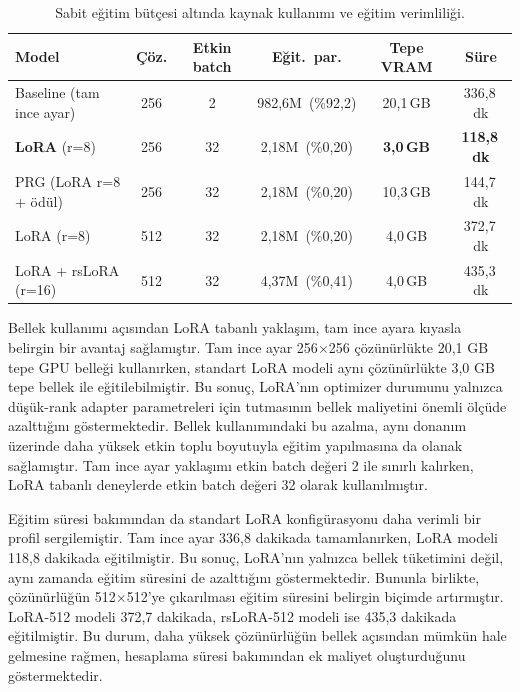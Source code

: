 \documentclass[11pt]{article}
\begin{document}
\begin{table}[htbp]
\centering
\caption{Sabit eğitim bütçesi altında kaynak kullanımı ve eğitim verimliliği.}
\label{tab:eff}
\small
\begin{tabular}{@{}lccccc@{}}
\toprule
\textbf{Model} & \textbf{Çöz.} & \textbf{Etkin batch} & \textbf{Eğit.\ par.} &
\textbf{Tepe VRAM} & \textbf{Süre} \\
\midrule
Baseline (tam ince ayar) & 256 & 2  & 982,6M\ (\%92,2) & 20,1\,GB & 336,8\,dk \\
\textbf{LoRA} (r=8)      & 256 & 32 & 2,18M\ (\%0,20)  & \textbf{3,0\,GB} & \textbf{118,8\,dk} \\
PRG (LoRA r=8 + ödül)    & 256 & 32 & 2,18M\ (\%0,20)  & 10,3\,GB & 144,7\,dk \\
LoRA (r=8)               & 512 & 32 & 2,18M\ (\%0,20)  & 4,0\,GB  & 372,7\,dk \\
LoRA + rsLoRA (r=16)     & 512 & 32 & 4,37M\ (\%0,41)  & 4,0\,GB  & 435,3\,dk \\
\bottomrule
\end{tabular}
\end{table}

Bellek kullanımı açısından LoRA tabanlı yaklaşım, tam ince ayara kıyasla belirgin
bir avantaj sağlamıştır. Tam ince ayar 256$\times$256 çözünürlükte 20,1 GB tepe
GPU belleği kullanırken, standart LoRA modeli aynı çözünürlükte 3,0 GB tepe
bellek ile eğitilebilmiştir. Bu sonuç, LoRA'nın optimizer durumunu yalnızca
düşük-rank adapter parametreleri için tutmasının bellek maliyetini önemli ölçüde
azalttığını göstermektedir. Bellek kullanımındaki bu azalma, aynı donanım
üzerinde daha yüksek etkin toplu boyutuyla eğitim yapılmasına da olanak
sağlamıştır. Tam ince ayar yaklaşımı etkin batch değeri 2 ile sınırlı kalırken,
LoRA tabanlı deneylerde etkin batch değeri 32 olarak kullanılmıştır.

Eğitim süresi bakımından da standart LoRA konfigürasyonu daha verimli bir
profil sergilemiştir. Tam ince ayar 336,8 dakikada tamamlanırken, LoRA modeli
118,8 dakikada eğitilmiştir. Bu sonuç, LoRA'nın yalnızca bellek tüketimini değil,
aynı zamanda eğitim süresini de azalttığını göstermektedir. Bununla birlikte,
çözünürlüğün 512$\times$512'ye çıkarılması eğitim süresini belirgin biçimde
artırmıştır. LoRA-512 modeli 372,7 dakikada, rsLoRA-512 modeli ise 435,3
dakikada eğitilmiştir. Bu durum, daha yüksek çözünürlüğün bellek açısından
mümkün hale gelmesine rağmen, hesaplama süresi bakımından ek maliyet oluşturduğunu
göstermektedir.
\end{document}
